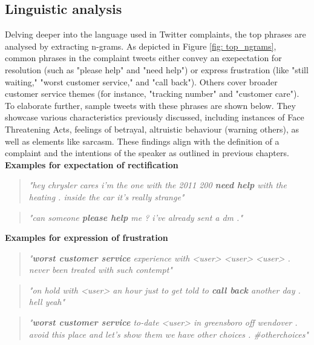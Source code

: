 \subsection{Linguistic analysis}
Delving deeper into the language used in Twitter complaints, the top phrases are analysed by extracting n-grams. As depicted in Figure \ref{fig: top_ngrams}, common phrases in the complaint tweets either convey an exepectation for resolution (such as "please help" and "need help") or express frustration (like "still waiting," "worst customer service," and "call back"). Others cover  broader customer service themes (for instance, "tracking number" and "customer care"). To elaborate further, sample tweets with these phrases are shown below. They showcase various characteristics previously discussed, including instances of Face Threatening Acts, feelings of betrayal, altruistic behaviour (warning others), as well as elements like sarcasm. These findings align with the definition of a complaint and the intentions of the speaker as outlined in previous chapters.\\

\textbf{Examples for expectation of rectification}
\begin{quote}
    \textit{"hey chrysler cares i'm the one with the 2011 200 \textbf{need help} with the heating . inside the car it's really strange"}
\end{quote}
\begin{quote}
    \textit{"can someone \textbf{please help} me ? i've already sent a dm ."}
\end{quote}
\textbf{Examples for expression of frustration}
\begin{quote}
    \textit{"\textbf{worst customer service} experience with <user> <user> <user> . never been treated with such contempt"}
\end{quote}
\begin{quote}
    \textit{"on hold with <user> an hour just to get told to \textbf{call back} another day . hell yeah"}
\end{quote}
\begin{quote}
    \textit{"\textbf{worst customer service} to-date <user> in greensboro off wendover . avoid this place and let's show them we have other choices . \#otherchoices"}
\end{quote}

